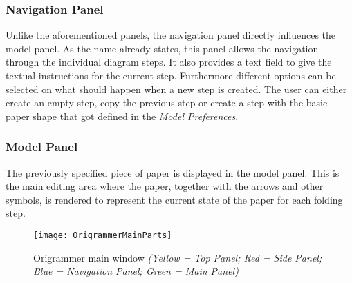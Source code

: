 \subsubsection*{Navigation Panel}
Unlike the aforementioned panels, the navigation panel directly influences the model panel. As the name already states, this panel allows the navigation through the individual diagram steps. It also provides a text field to give the textual instructions for the current step. Furthermore different options can be selected on what should happen when a new step is created. The user can either create an empty step, copy the previous step or create a step with the basic paper shape that got defined in the \emph{Model Preferences}.

\subsubsection*{Model Panel}
The previously specified piece of paper is displayed in the model panel. This is the main editing area where the paper, together with the arrows and other symbols, is rendered to represent the current state of the paper for each folding step.
\begin{figure}[htbp]
	\centering
	\texttt{[image: OrigrammerMainParts]}
	\caption{Origrammer main window \emph{(Yellow = Top Panel; Red = Side Panel; Blue = Navigation Panel; Green = Main Panel)}}
	\label{fig:origrammerMain}
\end{figure}